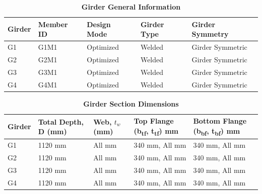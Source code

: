 \documentclass[12pt,a4paper]{report}
\numberwithin{table}{chapter}
\numberwithin{figure}{chapter}
\begin{document}
\newpage

\vspace{0.4em}
\noindent
            
\vspace{4pt}
\begin{longtable}{|L{2.2cm}|L{1.8cm}|p{3.8cm}|p{3.8cm}|p{3.8cm}|}
\caption{\textbf{Girder General Information}}
\hline
\textbf{Girder} & \textbf{Member ID} & \textbf{Design Mode} & \textbf{Girder Type} & \textbf{Girder Symmetry} \\[6pt]
\hline
G1 & G1M1 & Optimized & Welded & Girder Symmetric \\[8pt]
\hline
G2 & G2M1 & Optimized & Welded & Girder Symmetric \\[8pt]
\hline
G3 & G3M1 & Optimized & Welded & Girder Symmetric \\[8pt]
\hline
G4 & G4M1 & Optimized & Welded & Girder Symmetric \\[8pt]
\hline
\end{longtable}

\vspace{0.6em}

\vspace{4pt}
\begin{longtable}{|L{1.8cm}|L{2.3cm}|L{1.8cm}|p{4.8cm}|p{4.8cm}|}
\caption{\textbf{Girder Section Dimensions}}
\hline
\textbf{Girder} & \textbf{Total Depth, D (mm)} & \textbf{Web, $t_w$ (mm)} & \textbf{Top Flange (b\textsubscript{tf}, t\textsubscript{tf}) mm} & \textbf{Bottom Flange (b\textsubscript{bf}, t\textsubscript{bf}) mm} \\[6pt]
\hline
G1 & 1120 mm & All mm & 340 mm, All mm & 340 mm, All mm \\[8pt]
\hline
G2 & 1120 mm & All mm & 340 mm, All mm & 340 mm, All mm \\[8pt]
\hline
G3 & 1120 mm & All mm & 340 mm, All mm & 340 mm, All mm \\[8pt]
\hline
G4 & 1120 mm & All mm & 340 mm, All mm & 340 mm, All mm \\[8pt]
\hline
\end{longtable}

\vspace{0.6em}
\end{document}
